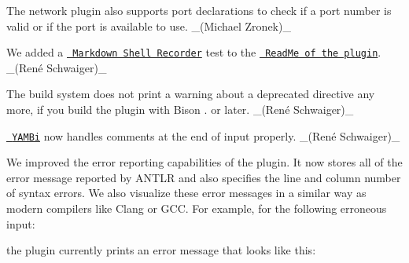 \begin{DoxyItemize}
\item The {\ttfamily network} plugin also supports port declarations to check if a port number is valid or if the port is available to use. \+\_\+(\+Michael Zronek)\+\_\+
\item We added a \href{https://master.libelektra.org/tests/shell/shell_recorder/tutorial_wrapper}{\texttt{ Markdown Shell Recorder}} test to the \href{https://www.libelektra.org/plugins/network}{\texttt{ Read\+Me of the plugin}}. \+\_\+(René Schwaiger)\+\_\+
\end{DoxyItemize}


\begin{DoxyItemize}
\item The build system does not print a warning about a deprecated directive any more, if you build the plugin with Bison {.} or later. \+\_\+(René Schwaiger)\+\_\+
\item \href{https://www.libelektra.org/plugins/yambi}{\texttt{ Y\+A\+M\+Bi}} now handles comments at the end of input properly. \+\_\+(René Schwaiger)\+\_\+
\end{DoxyItemize}


\begin{DoxyItemize}
\item We improved the error reporting capabilities of the plugin. It now stores all of the error message reported by A\+N\+T\+LR and also specifies the line and column number of syntax errors. We also visualize these error messages in a similar way as modern compilers like Clang or G\+CC. For example, for the following erroneous input\+:
\end{DoxyItemize}


\begin{DoxyCode}{0}
\end{DoxyCode}


the plugin currently prints an error message that looks like this\+:


\begin{DoxyCode}{0}
\DoxyCodeLine{                 \string^\string^}
\DoxyCodeLine{                                                      \string^}
\end{DoxyCode}


